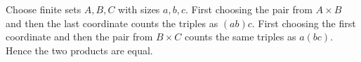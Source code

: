Choose finite sets $A,B,C$ with sizes $a,b,c$. First choosing the pair from $A\times B$ and then the last coordinate counts the triples as $(ab)c$. First choosing the first coordinate and then the pair from $B\times C$ counts the same triples as $a(bc)$. Hence the two products are equal.
